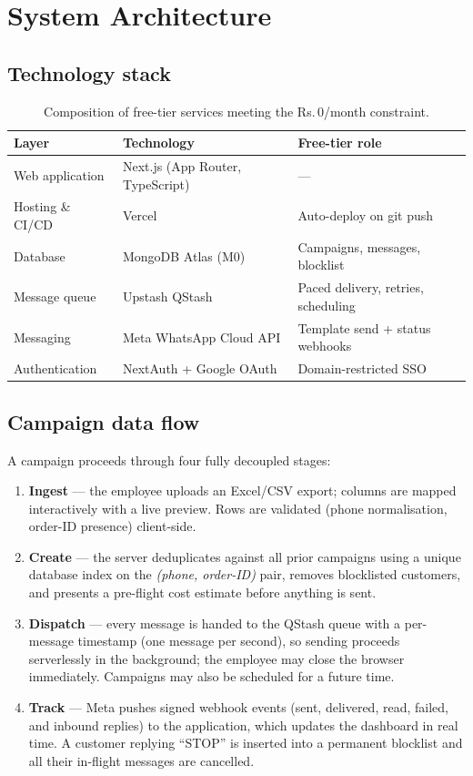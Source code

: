 \documentclass[11pt,a4paper]{article}
\newcommand{\rupee}{Rs.\,}
\begin{document}
\section{System Architecture}

\subsection{Technology stack}

\begin{table}[h]
\centering
\begin{tabular}{lll}
\toprule
\textbf{Layer} & \textbf{Technology} & \textbf{Free-tier role} \\
\midrule
Web application & Next.js (App Router, TypeScript) & --- \\
Hosting \& CI/CD & Vercel & Auto-deploy on git push \\
Database & MongoDB Atlas (M0) & Campaigns, messages, blocklist \\
Message queue & Upstash QStash & Paced delivery, retries, scheduling \\
Messaging & Meta WhatsApp Cloud API & Template send + status webhooks \\
Authentication & NextAuth + Google OAuth & Domain-restricted SSO \\
\bottomrule
\end{tabular}
\caption{Composition of free-tier services meeting the \rupee 0/month constraint.}
\end{table}

\subsection{Campaign data flow}

A campaign proceeds through four fully decoupled stages:

\begin{enumerate}[nosep]
  \item \textbf{Ingest} --- the employee uploads an Excel/CSV export;
        columns are mapped interactively with a live preview. Rows are
        validated (phone normalisation, order-ID presence) client-side.
  \item \textbf{Create} --- the server deduplicates against all prior
        campaigns using a unique database index on the
        \emph{(phone, order-ID)} pair, removes blocklisted customers, and
        presents a pre-flight cost estimate before anything is sent.
  \item \textbf{Dispatch} --- every message is handed to the QStash queue
        with a per-message timestamp (one message per second), so sending
        proceeds serverlessly in the background; the employee may close
        the browser immediately. Campaigns may also be scheduled for a
        future time.
  \item \textbf{Track} --- Meta pushes signed webhook events (sent,
        delivered, read, failed, and inbound replies) to the application,
        which updates the dashboard in real time. A customer replying
        ``STOP'' is inserted into a permanent blocklist and all their
        in-flight messages are cancelled.
\end{enumerate}
\end{document}
